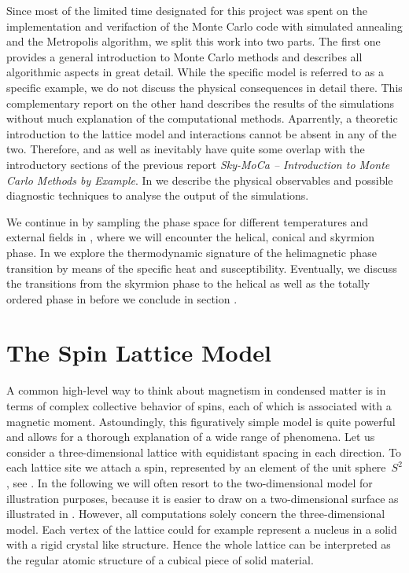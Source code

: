 Since most of the limited time designated for this project was spent on the
implementation and verifaction of the Monte Carlo code with simulated annealing
and the Metropolis algorithm, we split this work into two parts. The first one
provides a general introduction to Monte Carlo methods and describes all
algorithmic aspects in great detail. While the specific model is referred to as
a specific example, we do not discuss the physical consequences in detail there.
This complementary report on the other hand describes the results of the
simulations without much explanation of the computational methods. Aparrently, a
theoretic introduction to the lattice model and interactions cannot be absent in
any of the two. Therefore,  and  as
well as  inevitably have quite some overlap with the
introductory sections of the previous report \emph{Sky-MoCa -- Introduction to
Monte Carlo Methods by Example}. In  we describe the
physical observables and possible diagnostic techniques to analyse the output of
the simulations.

We continue in  by sampling the phase space for different
temperatures and external fields in , where we will encounter
the helical, conical and skyrmion phase. In  we explore the
thermodynamic signature of the helimagnetic phase transition by means of the
specific heat and susceptibility. Eventually, we discuss the transitions from
the skyrmion phase to the helical as well as the totally ordered phase in
 before we conclude in section .
%
\section{The Spin Lattice Model}\label{sec:lattice}
%
A common high-level way to think about magnetism in condensed matter is in terms
of complex collective behavior of spins, each of which is associated with a
magnetic moment. Astoundingly, this figuratively simple model is quite powerful
and allows for a thorough explanation of a wide range of phenomena. Let us
consider a three-dimensional lattice with equidistant spacing in each direction.
To each lattice site we attach a spin, represented by an element of the unit
sphere~$S^2$, see . In the following we will often resort to the
two-dimensional model for illustration purposes, because it is easier to draw on
a two-dimensional surface as illustrated in . However, all
computations solely concern the three-dimensional model. Each vertex of the
lattice could for example represent a nucleus in a solid with a rigid crystal
like structure. Hence the whole lattice can be interpreted as the regular atomic
structure of a cubical piece of solid material.

